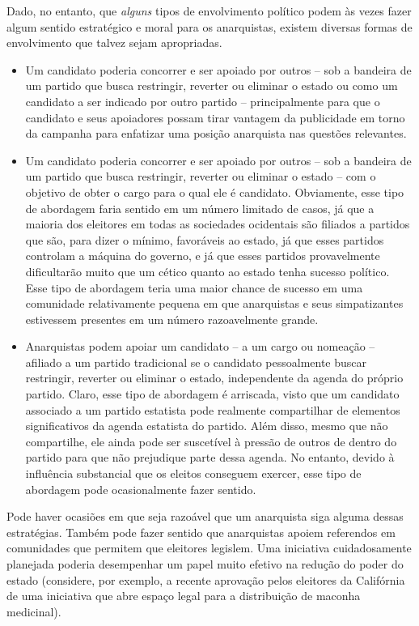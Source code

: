 Dado, no entanto, que \emph{alguns} tipos de envolvimento político podem às vezes fazer algum sentido estratégico e moral para os anarquistas, existem diversas formas de envolvimento que talvez sejam apropriadas.

\begin{itemize}
\item Um candidato poderia concorrer e ser apoiado por outros -- sob a bandeira de um partido que busca restringir, reverter ou eliminar o estado ou como um candidato a ser indicado por outro partido -- principalmente para que o candidato e seus apoiadores possam tirar vantagem da publicidade em torno da campanha para enfatizar uma posição anarquista nas questões relevantes.

\item Um candidato poderia concorrer e ser apoiado por outros -- sob a bandeira de um partido que busca restringir, reverter ou eliminar o estado -- com o objetivo de obter o cargo para o qual ele é candidato. Obviamente, esse tipo de abordagem faria sentido em um número limitado de casos, já que a maioria dos eleitores em todas as sociedades ocidentais são filiados a partidos que são, para dizer o mínimo, favoráveis ao estado, já que esses partidos controlam a máquina do governo, e já que esses partidos provavelmente dificultarão muito que um cético quanto ao estado tenha sucesso político. Esse tipo de abordagem teria uma maior chance de sucesso em uma comunidade relativamente pequena em que anarquistas e seus simpatizantes estivessem presentes em um número razoavelmente grande.

\item Anarquistas podem apoiar um candidato -- a um cargo ou nomeação -- afiliado a um partido tradicional se o candidato pessoalmente buscar restringir, reverter ou eliminar o estado, independente da agenda do próprio partido. Claro, esse tipo de abordagem é arriscada, visto que um candidato associado a um partido estatista pode realmente compartilhar de elementos significativos da agenda estatista do partido. Além disso, mesmo que não compartilhe, ele ainda pode ser suscetível à pressão de outros de dentro do partido para que não prejudique parte dessa agenda. No entanto, devido à influência substancial que os eleitos conseguem exercer, esse tipo de abordagem pode ocasionalmente fazer sentido.
\end{itemize}

Pode haver ocasiões em que seja razoável que um anarquista siga alguma dessas estratégias. Também pode fazer sentido que anarquistas apoiem referendos em comunidades que permitem que eleitores legislem. Uma iniciativa cuidadosamente planejada poderia desempenhar um papel muito efetivo na redução do poder do estado (considere, por exemplo, a recente aprovação pelos eleitores da Califórnia de uma iniciativa que abre espaço legal para a distribuição de maconha medicinal).

